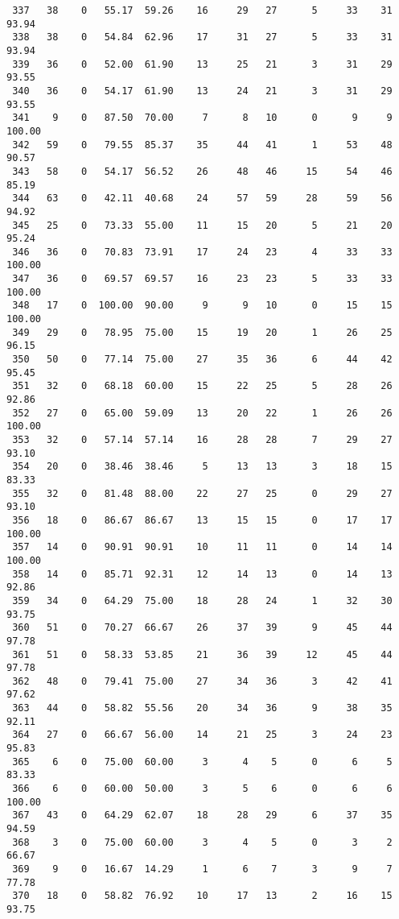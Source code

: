\begin{verbatim}
 337   38    0   55.17  59.26    16     29   27      5     33    31    93.94
 338   38    0   54.84  62.96    17     31   27      5     33    31    93.94
 339   36    0   52.00  61.90    13     25   21      3     31    29    93.55
 340   36    0   54.17  61.90    13     24   21      3     31    29    93.55
 341    9    0   87.50  70.00     7      8   10      0      9     9   100.00
 342   59    0   79.55  85.37    35     44   41      1     53    48    90.57
 343   58    0   54.17  56.52    26     48   46     15     54    46    85.19
 344   63    0   42.11  40.68    24     57   59     28     59    56    94.92
 345   25    0   73.33  55.00    11     15   20      5     21    20    95.24
 346   36    0   70.83  73.91    17     24   23      4     33    33   100.00
 347   36    0   69.57  69.57    16     23   23      5     33    33   100.00
 348   17    0  100.00  90.00     9      9   10      0     15    15   100.00
 349   29    0   78.95  75.00    15     19   20      1     26    25    96.15
 350   50    0   77.14  75.00    27     35   36      6     44    42    95.45
 351   32    0   68.18  60.00    15     22   25      5     28    26    92.86
 352   27    0   65.00  59.09    13     20   22      1     26    26   100.00
 353   32    0   57.14  57.14    16     28   28      7     29    27    93.10
 354   20    0   38.46  38.46     5     13   13      3     18    15    83.33
 355   32    0   81.48  88.00    22     27   25      0     29    27    93.10
 356   18    0   86.67  86.67    13     15   15      0     17    17   100.00
 357   14    0   90.91  90.91    10     11   11      0     14    14   100.00
 358   14    0   85.71  92.31    12     14   13      0     14    13    92.86
 359   34    0   64.29  75.00    18     28   24      1     32    30    93.75
 360   51    0   70.27  66.67    26     37   39      9     45    44    97.78
 361   51    0   58.33  53.85    21     36   39     12     45    44    97.78
 362   48    0   79.41  75.00    27     34   36      3     42    41    97.62
 363   44    0   58.82  55.56    20     34   36      9     38    35    92.11
 364   27    0   66.67  56.00    14     21   25      3     24    23    95.83
 365    6    0   75.00  60.00     3      4    5      0      6     5    83.33
 366    6    0   60.00  50.00     3      5    6      0      6     6   100.00
 367   43    0   64.29  62.07    18     28   29      6     37    35    94.59
 368    3    0   75.00  60.00     3      4    5      0      3     2    66.67
 369    9    0   16.67  14.29     1      6    7      3      9     7    77.78
 370   18    0   58.82  76.92    10     17   13      2     16    15    93.75

\end{verbatim}
